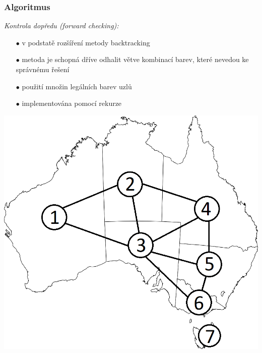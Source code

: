 \documentclass[10pt,xcolor=pdflatex]{beamer}
\begin{document}
\begin{frame}\frametitle{Algoritmus}
    \emph{Kontrola dopředu (forward checking):}
    \begin{itemize}
    \item[$\bullet$] v podstatě rozšíření metody backtracking
    \item[$\bullet$] metoda je schopná dříve odhalit větve kombinací barev, které nevedou ke správnému řešení
    \item[$\bullet$] použití množin legálních barev uzlů
    \item[$\bullet$] implementována pomocí rekurze
	\end{itemize}
    \includegraphics[scale=0.3]{img/australia.png}

\end{frame}
\end{document}
